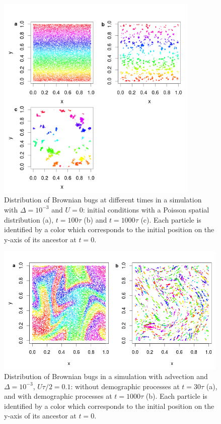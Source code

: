 \begin{figure}[H]
\begin{center} 
 \includegraphics[width=0.86\textwidth]{../code/figure/spatial_distribution_Fig1.png}
  \caption{Distribution of Brownian bugs at different times in a simulation with $\Delta=10^{-3}$ and $U=0$: initial conditions with a Poisson spatial distribution (a), $t=100\tau$ (b) and $t=1000\tau$ (c). Each particle is identified by a color which corresponds to the initial position on the y-axis of its ancestor at $t=0$.}
  \label{fig:spatial_fig1}
\end{center}
  \end{figure}

\begin{figure}[H]
\begin{center}
\includegraphics[width=0.99\textwidth]{../code/figure/spatial_distribution_Fig2.png}
  \caption{Distribution of Brownian bugs in a simulation with advection and $\Delta=10^{-3}$, $U\tau/2=0.1$: without demographic processes at $t=30\tau$ (a), and with demographic processes at $t=1000\tau$ (b). Each particle is identified by a color which corresponds to the initial position on the y-axis of its ancestor at $t=0$.}
  \label{fig:spatial_fig2}
\end{center}
  \end{figure}


